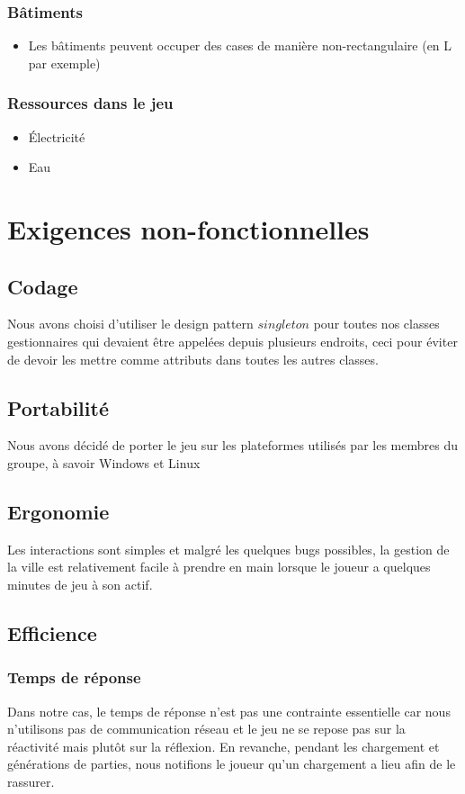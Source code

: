 \documentclass[a4paper,10pt,openany,oneside]{report}
\begin{document}
\subsubsection{Bâtiments}
\begin{itemize}
\item Les bâtiments peuvent occuper des cases de manière non-rectangulaire (en L par exemple)
\end{itemize}

\subsubsection{Ressources dans le jeu}
\begin{itemize}
\item Électricité
\item Eau
\end{itemize}

\section{Exigences non-fonctionnelles}
\subsection{Codage}
Nous avons choisi d'utiliser le design pattern $singleton$ pour toutes nos classes gestionnaires qui devaient être appelées depuis plusieurs endroits, ceci pour éviter de devoir les mettre comme attributs dans toutes les autres classes.
\subsection{Portabilité}
Nous avons décidé de porter le jeu sur les plateformes utilisés par les membres du groupe, à savoir Windows et Linux
\subsection{Ergonomie}
Les interactions sont simples et malgré les quelques bugs possibles, la gestion de la ville est relativement facile à prendre en main lorsque le joueur a quelques minutes de jeu à son actif.
\subsection{Efficience}
\subsubsection{Temps de réponse}
Dans notre cas, le temps de réponse n'est pas une contrainte essentielle car nous n'utilisons pas de communication réseau et le jeu ne se repose pas sur la réactivité mais plutôt sur la réflexion. En revanche, pendant les chargement et générations de parties, nous notifions le joueur qu'un chargement a lieu afin de le rassurer.
\end{document}
